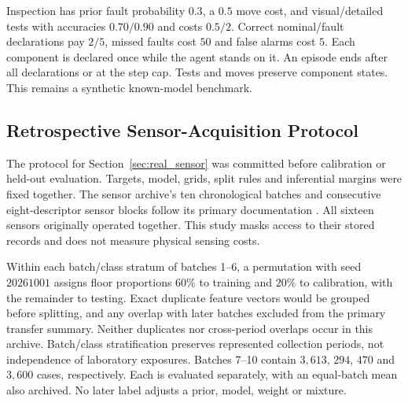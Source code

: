 \documentclass[manuscript, screen, review]{jair}
\begin{document}
Inspection has prior fault probability $0.3$, a $0.5$ move cost, and visual/detailed tests with accuracies $0.70/0.90$ and costs $0.5/2$. Correct nominal/fault declarations pay $2/5$, missed faults cost $50$ and false alarms cost $5$. Each component is declared once while the agent stands on it. An episode ends after all declarations or at the step cap. Tests and moves preserve component states. This remains a synthetic known-model benchmark.

\FloatBarrier

\subsection{Retrospective Sensor-Acquisition Protocol}
\label{app:real_sensor}

The protocol for Section~\ref{sec:real_sensor} was committed before calibration or held-out evaluation. Targets, model, grids, split rules and inferential margins were fixed together. The sensor archive's ten chronological batches and consecutive eight-descriptor sensor blocks follow its primary documentation \citep{vergara2012data}. All sixteen sensors originally operated together. This study masks access to their stored records and does not measure physical sensing costs.

Within each batch/class stratum of batches 1--6, a permutation with seed $20261001$ assigns floor proportions $60\%$ to training and $20\%$ to calibration, with the remainder to testing. Exact duplicate feature vectors would be grouped before splitting, and any overlap with later batches excluded from the primary transfer summary. Neither duplicates nor cross-period overlaps occur in this archive. Batch/class stratification preserves represented collection periods, not independence of laboratory exposures. Batches 7--10 contain $3{,}613$, $294$, $470$ and $3{,}600$ cases, respectively. Each is evaluated separately, with an equal-batch mean also archived. No later label adjusts a prior, model, weight or mixture.
\end{document}
